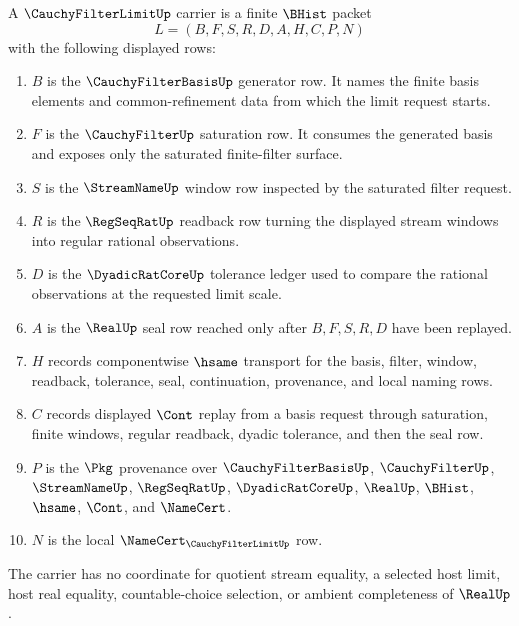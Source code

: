 \begin{definition}
\label{def:cauchy-filter-limit-carrier}
A $\CauchyFilterLimitUp$ carrier is a finite $\BHist$ packet
$$
L=(B,F,S,R,D,A,H,C,P,N)
$$
with the following displayed rows:
\begin{enumerate}
\item $B$ is the $\CauchyFilterBasisUp$ generator row. It names the finite basis elements and common-refinement data from which the limit request starts.
\item $F$ is the $\CauchyFilterUp$ saturation row. It consumes the generated basis and exposes only the saturated finite-filter surface.
\item $S$ is the $\StreamNameUp$ window row inspected by the saturated filter request.
\item $R$ is the $\RegSeqRatUp$ readback row turning the displayed stream windows into regular rational observations.
\item $D$ is the $\DyadicRatCoreUp$ tolerance ledger used to compare the rational observations at the requested limit scale.
\item $A$ is the $\RealUp$ seal row reached only after $B,F,S,R,D$ have been replayed.
\item $H$ records componentwise $\hsame$ transport for the basis, filter, window, readback, tolerance, seal, continuation, provenance, and local naming rows.
\item $C$ records displayed $\Cont$ replay from a basis request through saturation, finite windows, regular readback, dyadic tolerance, and then the seal row.
\item $P$ is the $\Pkg$ provenance over $\CauchyFilterBasisUp$, $\CauchyFilterUp$, $\StreamNameUp$, $\RegSeqRatUp$, $\DyadicRatCoreUp$, $\RealUp$, $\BHist$, $\hsame$, $\Cont$, and $\NameCert$.
\item $N$ is the local $\NameCert_{\CauchyFilterLimitUp}$ row.
\end{enumerate}
The carrier has no coordinate for quotient stream equality, a selected host limit, host real equality, countable-choice selection, or ambient completeness of $\RealUp$.
\end{definition}

